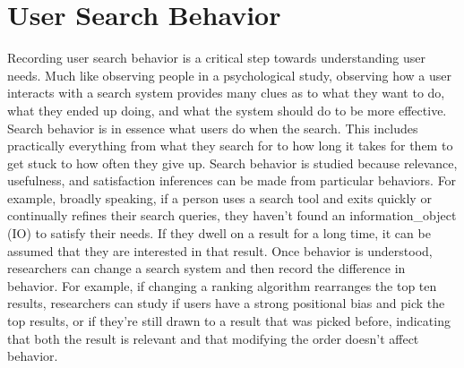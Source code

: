 \section{User Search Behavior}

Recording user search behavior is a critical step towards understanding user needs. Much like observing people in a psychological study, observing how a user interacts with a search system provides many clues as to what they want to do, what they ended up doing, and what the system should do to be more effective. Search behavior is in essence what users do when the search. This includes practically everything from what they search for to how long it takes for them to get stuck to how often they give up. Search behavior is studied because relevance, usefulness, and satisfaction inferences can be made from particular behaviors. For example, broadly speaking, if a person uses a search tool and exits quickly or continually refines their search queries, they haven't found an \gls{information_object} (\acrshort{IO}) to satisfy their needs. If they dwell on a result for a long time, it can be assumed that they are interested in that result. Once behavior is understood, researchers can change a search system and then record the difference in behavior. For example, if changing a ranking algorithm rearranges the top ten results, researchers can study if users have a strong positional bias and pick the top results, or if they're still drawn to a result that was picked before, indicating that both the result is relevant and that modifying the order doesn't affect behavior.

